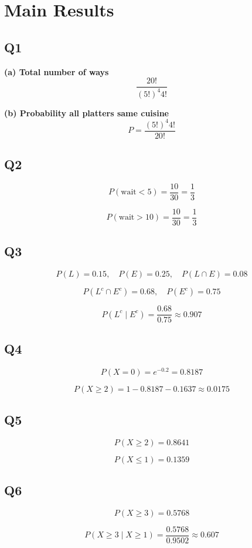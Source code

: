 \documentclass[12pt]{article}
\begin{document}
\section*{Main Results}

\subsection*{Q1}

\textbf{(a) Total number of ways}
\[
\frac{20!}{(5!)^4 4!}
\]

\textbf{(b) Probability all platters same cuisine}
\[
P = \frac{(5!)^4 4!}{20!}
\]

\subsection*{Q2}

\[
P(\text{wait} < 5) = \frac{10}{30} = \frac{1}{3}
\]

\[
P(\text{wait} > 10) = \frac{10}{30} = \frac{1}{3}
\]

\subsection*{Q3}

\[
P(L)=0.15,\quad P(E)=0.25,\quad P(L \cap E)=0.08
\]

\[
P(L^c \cap E^c)=0.68,\quad P(E^c)=0.75
\]

\[
P(L^c \mid E^c) = \frac{0.68}{0.75} \approx 0.907
\]

\subsection*{Q4}

\[
P(X=0)=e^{-0.2}=0.8187
\]

\[
P(X\ge2)=1-0.8187-0.1637 \approx 0.0175
\]

\subsection*{Q5}

\[
P(X\ge2)=0.8641
\]

\[
P(X\le1)=0.1359
\]

\subsection*{Q6}

\[
P(X\ge3)=0.5768
\]

\[
P(X\ge3 \mid X\ge1)=\frac{0.5768}{0.9502} \approx 0.607
\]
\end{document}
